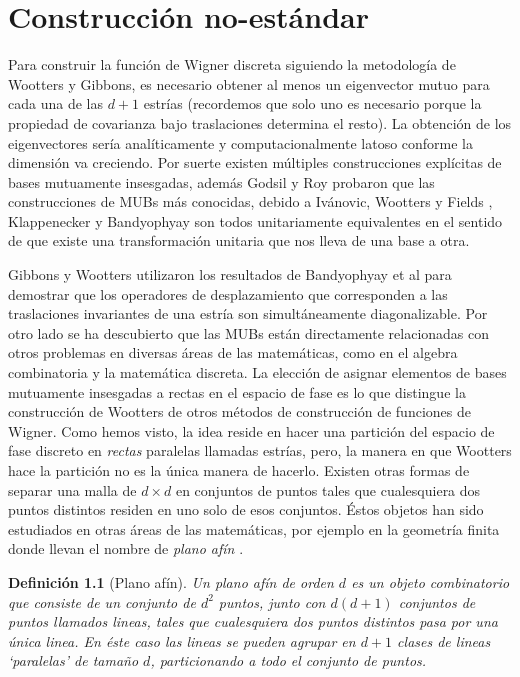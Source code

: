 \documentclass[a4paper]{report}
\newtheorem{definition}{Definición}
\begin{document}
  \chapter{Construcción no-estándar}

  Para construir la función de Wigner discreta siguiendo la
  metodología de Wootters y Gibbons, es necesario obtener
  al menos un eigenvector mutuo para cada una de las $d+1$
  estrías (recordemos que solo uno es necesario porque la
  propiedad de covarianza bajo traslaciones determina el
  resto). La obtención de los eigenvectores sería
  analíticamente y computacionalmente latoso conforme la
  dimensión va creciendo. Por suerte existen múltiples
  construcciones explícitas de bases mutuamente insesgadas,
  además Godsil y Roy \cite{godsil2009} probaron que las
  construcciones de MUBs más conocidas, debido a Ivánovic,
  Wootters y Fields \cite{wootters1989}, Klappenecker
  \cite{klappenecker2005a} y Bandyophyay
  \cite{bandyopadhyay2001} son todos unitariamente
  equivalentes en el sentido de que existe una
  transformación unitaria que nos lleva de una base a otra.

  Gibbons y Wootters utilizaron los resultados de
  Bandyophyay et al para demostrar que los operadores de
  desplazamiento que corresponden a las traslaciones
  invariantes de una estría son simultáneamente
  diagonalizable. Por otro lado se ha descubierto que las
  MUBs están directamente relacionadas con otros problemas
  en diversas áreas de las matemáticas, como en el algebra
  combinatoria y la matemática discreta. La elección de
  asignar elementos de bases mutuamente insesgadas a rectas
  en el espacio de fase es lo que distingue la construcción
  de Wootters de otros métodos de construcción de funciones
  de Wigner. Como hemos visto, la idea reside en hacer una
  partición del espacio de fase discreto en \textit{rectas}
  paralelas llamadas estrías, pero, la manera en que
  Wootters hace la partición no es la única manera de
  hacerlo. Existen otras formas de separar una malla de $d
  \times d$ en conjuntos de puntos tales que cualesquiera
  dos puntos distintos residen en uno solo de esos
  conjuntos. Éstos objetos han sido estudiados en otras
  áreas de las matemáticas, por ejemplo en la geometría
  finita donde llevan el nombre de \textit{plano afín}
  \cite{kantor2012}. 

  \begin{definition}[Plano afín]
    Un plano afín de orden $d$ es un objeto combinatorio que
    consiste de un conjunto de $d^2$ puntos, junto con
    $d(d+1)$ conjuntos de puntos llamados \textit{lineas},
    tales que cualesquiera dos puntos distintos pasa por una
    única linea. En éste caso las lineas se pueden agrupar
    en $d+1$ clases de lineas `paralelas' de tamaño $d$,
    particionando a todo el conjunto de puntos. 
  \end{definition}
\end{document}
